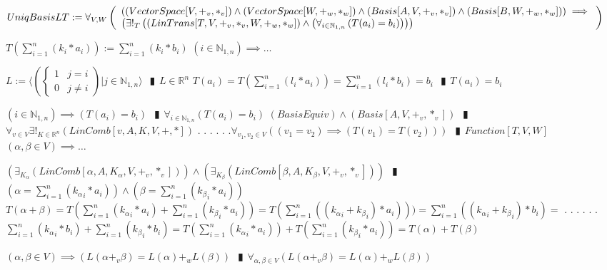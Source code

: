 \documentclass{book}
\newcommand{\abr}{:=}
\newcommand{\cont}{\phantom{.}. . .\phantom{.}}
\newcommand{\pipe}{$\phantom{(}\vrectangleblack\phantom{)}$}
\newcommand{\pr}[1]{\left(#1\right)}
\begin{document}
$UniqBasisLT \abr \forall_{V, W}\left(\begin{array}{ll}
  \pr{(VectorSpace[V, +_v, *_v]) \land (VectorSpace[W, +_w, *_w]) \land (Basis[A, V, +_v, *_v]) \land (Basis[B, W, +_w, *_w])} \hfill \implies \hfill \\
  \pr{\exists!_{T}\pr{(LinTrans[T, V, +_v, *_v, W, +_w, *_w]) \land \pr{\forall_{i \in \mathbb{N}_{1, n}}\pr{T(a_i) = b_i}}}}
\end{array}\right)$
\begin{enumerate}
  \lit $T\pr{\sum_{i = 1}^{n}(k_i * a_i)} \abr \sum_{i = 1}^{n}(k_i * b_i)$
  \lit $(i \in \mathbb{N}_{1, n}) \implies \ldots$
  \begin{enumerate}
    \lit $L \abr \langle \left(\begin{cases} 
      1 & j = i \\
      0 & j \neq i 
    \end{cases}\right) | j \in \mathbb{N}_{1, n} \rangle$ \pipe $L \in \mathbb{R}^n$
    \lit $T(a_i) = T\pr{\sum_{i = 1}^{n}(l_i * a_i)} = \sum_{i = 1}^{n}(l_i * b_i) = b_i$ \pipe $T(a_i) = b_i$
  \end{enumerate}
  \lit $(i \in \mathbb{N}_{1, n}) \implies \pr{T(a_i) = b_i}$ \pipe $\forall_{i \in \mathbb{N}_{1, n}}\pr{T(a_i) = b_i}$
  \lit $(BasisEquiv) \land (Basis[A, V, +_v, *_v])$ \pipe $\forall_{v \in V} \exists!_{K \in \mathbb{R}^n}(LinComb[v, A, K, V, +, *])$ \cont
  \lit \cont $\forall_{v_1, v_2 \in V}\pr{(v_1 = v_2) \implies \pr{T(v_1) = T(v_2)}}$ \pipe $Function[T, V, W]$
  \lit $(\alpha, \beta \in V) \implies \ldots$
  \begin{enumerate}
    \lit $\pr{\exists_{K_\alpha}(LinComb[\alpha, A, K_\alpha, V, +_v, *_v])} \land \pr{\exists_{K_\beta}(LinComb[\beta, A, K_\beta, V, +_v, *_v])}$ \pipe $\pr{\alpha = \sum_{i = 1}^{n}({k_\alpha}_i * a_i)} \land \pr{\beta = \sum_{i = 1}^{n}({k_\beta}_i * a_i)}$
    \lit $T(\alpha + \beta) = T\pr{\sum_{i = 1}^{n}({k_\alpha}_i * a_i) + \sum_{i = 1}^{n}({k_\beta}_i * a_i)} = T\pr{\sum_{i = 1}^{n}\pr{({k_\alpha}_i + {k_\beta}_i) * a_i}}) = \sum_{i = 1}^{n}\pr{({k_\alpha}_i + {k_\beta}_i) * b_i} = $ \cont
    \lit \cont $\sum_{i = 1}^{n}({k_\alpha}_i * b_i) + \sum_{i = 1}^{n}({k_\beta}_i * b_i) = T\pr{\sum_{i = 1}^{n}({k_\alpha}_i * a_i)} + T\pr{\sum_{i = 1}^{n}({k_\beta}_i * a_i)} = T(\alpha) + T(\beta)$
  \end{enumerate}
  \lit $(\alpha, \beta \in V) \implies \pr{L(\alpha +_v \beta) = L(\alpha) +_w L(\beta)}$ \pipe $\forall_{\alpha, \beta \in V}\pr{L(\alpha +_v \beta) = L(\alpha) +_w L(\beta)}$

\end{enumerate}
\end{document}
